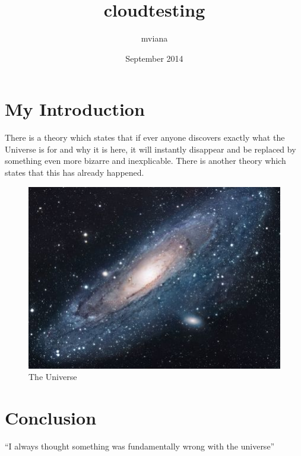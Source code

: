 \documentclass{article}
\title{cloudtesting}
\author{mviana }
\date{September 2014}
\begin{document}
\maketitle

\section{My Introduction}
There is a theory which states that if ever anyone discovers exactly what the Universe is for and why it is here, it will instantly disappear and be replaced by something even more bizarre and inexplicable.
There is another theory which states that this has already happened.

\begin{figure}[h!]
\centering
\includegraphics[scale=1.7]{universe.jpg}
\caption{The Universe}
\label{fig:univerise}
\end{figure}

\section{Conclusion}
``I always thought something was fundamentally wrong with the universe'' \citep{adams1995hitchhiker}



\end{document}

